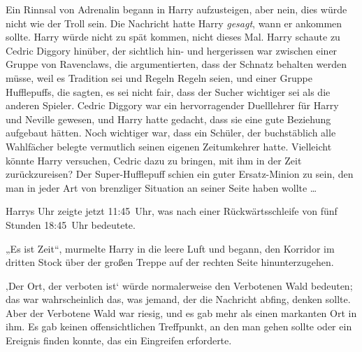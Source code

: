 Ein Rinnsal von Adrenalin begann in Harry aufzusteigen, aber nein, dies würde nicht wie der Troll sein. Die Nachricht hatte Harry \emph{gesagt}, wann er ankommen sollte. Harry würde nicht zu spät kommen, nicht dieses Mal. Harry schaute zu Cedric Diggory hinüber, der sichtlich hin- und hergerissen war zwischen einer Gruppe von Ravenclaws, die argumentierten, dass der Schnatz behalten werden müsse, weil es Tradition sei und Regeln Regeln seien, und einer Gruppe Hufflepuffs, die sagten, es sei nicht fair, dass der Sucher wichtiger sei als die anderen Spieler. Cedric Diggory war ein hervorragender Duelllehrer für Harry und Neville gewesen, und Harry hatte gedacht, dass sie eine gute Beziehung aufgebaut hätten. Noch wichtiger war, dass ein Schüler, der buchstäblich alle Wahlfächer belegte vermutlich seinen eigenen Zeitumkehrer hatte. Vielleicht könnte Harry versuchen, Cedric dazu zu bringen, mit ihm in der Zeit zurückzureisen? Der Super-Hufflepuff schien ein guter Ersatz-Minion zu sein, den man in jeder Art von brenzliger Situation an seiner Seite haben wollte …


Harrys Uhr zeigte jetzt 11:45~Uhr, was nach einer Rückwärtsschleife von fünf Stunden 18:45~Uhr bedeutete.

„Es ist Zeit“, murmelte Harry in die leere Luft und begann, den Korridor im dritten Stock über der großen Treppe auf der rechten Seite hinunterzugehen.

‚Der Ort, der verboten ist‘ würde normalerweise den Verbotenen Wald bedeuten; das war wahrscheinlich das, was jemand, der die Nachricht abfing, denken sollte. Aber der Verbotene Wald war riesig, und es gab mehr als einen markanten Ort in ihm. Es gab keinen offensichtlichen Treffpunkt, an den man gehen sollte oder ein Ereignis finden konnte, das ein Eingreifen erforderte.

